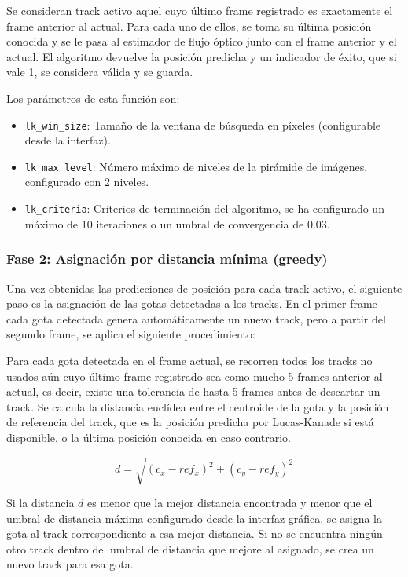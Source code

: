 Se consideran track activo aquel cuyo último frame registrado es exactamente el frame anterior al actual. Para cada uno de ellos, se toma su última posición conocida y se le pasa al estimador de flujo óptico junto con el frame anterior y el actual. El algoritmo devuelve la posición predicha y un indicador de éxito, que si vale 1, se considera válida y se guarda.

Los parámetros de esta función son:
\begin{itemize}
    \item \texttt{lk\_win\_size}: Tamaño de la ventana de búsqueda en píxeles (configurable desde la interfaz).
    \item \texttt{lk\_max\_level}: Número máximo de niveles de la pirámide de imágenes, configurado con 2 niveles.
    \item \texttt{lk\_criteria}: Criterios de terminación del algoritmo, se ha configurado un máximo de 10 iteraciones o un umbral de convergencia de 0.03.
\end{itemize}

\subsubsection{Fase 2: Asignación por distancia mínima (greedy)}

Una vez obtenidas las predicciones de posición para cada track activo, el siguiente paso es la asignación de las gotas detectadas a los tracks. En el primer frame cada gota detectada genera automáticamente un nuevo track, pero a partir del segundo frame, se aplica el siguiente procedimiento:

Para cada gota detectada en el frame actual, se recorren todos los tracks no usados aún cuyo último frame registrado sea como mucho 5 frames anterior al actual, es decir, existe una tolerancia de hasta 5 frames antes de descartar un track. Se calcula la distancia euclídea entre el centroide de la gota y la posición de referencia del track, que es la posición predicha por Lucas-Kanade si está disponible, o la última posición conocida en caso contrario.

\begin{equation}
    d = \sqrt{(c_{x} - ref_{x})^2 + (c_{y} - ref_{y})^2}
\end{equation}

Si la distancia $d$ es menor que la mejor distancia encontrada y menor que el umbral de distancia máxima configurado desde la interfaz gráfica, se asigna la gota al track correspondiente a esa mejor distancia. Si no se encuentra ningún otro track dentro del umbral de distancia que mejore al asignado, se crea un nuevo track para esa gota.


